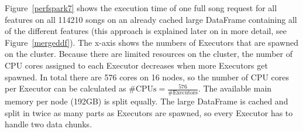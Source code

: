 \noindent Figure~\ref{perfspark7} shows the execution time of one full song request for all features on all 114210 songs on an already cached large DataFrame containing all of the different features (this approach is explained later on in more detail, see Figure~\ref{mergeddf}).
The x-axis shows the numbers of Executors that are spawned on the cluster. Because there are limited resources on the cluster, the number of CPU cores assigned to each Executor decreases when more Executors get spawned. In total there are 576 cores on 16 nodes, so the number of CPU cores per Executor can be calculated as $\#\text{CPUs} = \frac{576}{\#\text{Executors}}$. The available main memory per node (192GB) is split equally. The large DataFrame is cached and split in twice as many parts as Executors are spawned, so every Executor has to handle two data chunks.



